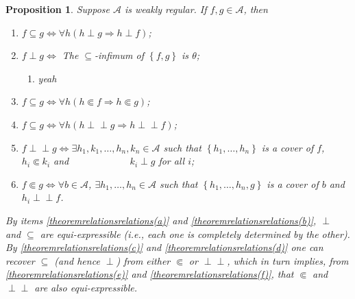 \documentclass[letter,11pt]{amsart}
\theoremstyle{plain}		\newtheorem{theorem}[generalnumbering]{Theorem}
\theoremstyle{plain}		\newtheorem{corollary}[generalnumbering]{Corollary}
\theoremstyle{definition}		\newtheorem{definition}[generalnumbering]{Definition}
\theoremstyle{definition}		\newtheorem{example}[generalnumbering]{Example}
\theoremstyle{plain}		\newtheorem{proposition}[generalnumbering]{Proposition}
\theoremstyle{plain}		\newtheorem{lemma}[generalnumbering]{Lemma}
\theoremstyle{plain}    \newtheorem{plainstyle}[generalnumbering]{\namefordifferentenvironment}
\theoremstyle{plain}    \newtheorem*{plainstyle*}{\namefordifferentenvironment}
\theoremstyle{definition}    \newtheorem{definitionstyle}[generalnumbering]{\namefordifferentenvironment}
\theoremstyle{definition}    \newtheorem*{definitionstyle*}{\namefordifferentenvironment}
\newcommand{\perpp}{\perp\!\!\!\perp}
\begin{document}
\begin{proposition}\label{propositionrelationsrelations}
	Suppose $\mathcal{A}$ is weakly regular. If $f,g\in\mathcal{A}$, then
	\begin{enumerate}[label=(\alph*)]
		\item\label{theoremrelationsrelations(a)} $f\subseteq g\iff\forall h(h\perp g\Rightarrow h\perp f)$;
		\item\label{theoremrelationsrelations(b)} $f\perp g\iff$ The $\subseteq$-infimum of $\left\{f,g\right\}$ is $\theta$;
		\begin{enumerate}[label=\alph*]
		\item yeah
		\end{enumerate}
		\item\label{theoremrelationsrelations(c)} $f\subseteq g\iff\forall h(h\Subset f\Rightarrow h\Subset g)$;
		\item\label{theoremrelationsrelations(d)} $f\subseteq g\iff\forall h(h\perpp g\Rightarrow h\perpp f)$;
		\item\label{theoremrelationsrelations(e)} $f\perpp g\iff\exists h_1,k_1,\ldots,h_n,k_n\in\mathcal{A}$ such that $\left\{h_1,\ldots,h_n\right\}$ is a cover of $f$, $h_i\Subset k_i$ and $\phantom{f\perpp g\iff...}k_i\perp g$ for all $i$;
		\item\label{theoremrelationsrelations(f)} $f\Subset g\iff\forall b\in\mathcal{A}$, $\exists h_1,\ldots,h_n\in\mathcal{A}$ such that $\left\{h_1,\ldots,h_n,g\right\}$ is a cover of $b$ and $h_i\perpp f$.
	\end{enumerate}
	By items \ref{theoremrelationsrelations(a)} and \ref{theoremrelationsrelations(b)}, $\perp$ and $\subseteq$ are equi-expressible (i.e., each one is completely determined by the other). By \ref{theoremrelationsrelations(c)} and \ref{theoremrelationsrelations(d)} one can recover $\subseteq$ (and hence $\perp$) from either $\Subset$ or $\perpp$, which in turn implies, from \ref{theoremrelationsrelations(e)} and \ref{theoremrelationsrelations(f)}, that $\Subset$ and $\perpp$ are also equi-expressible.
\end{proposition}
\end{document}
